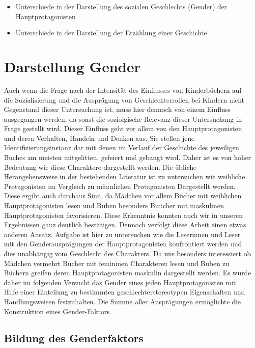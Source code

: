 \begin{itemize}
\item
  Unterschiede in der Darstellung des sozialen Geschlechts (Gender) der
  Hauptprotagonisten
\item
  Unterschiede in der Darstellung der Erzählung einer Geschichte
\end{itemize}

\section{Darstellung Gender}

Auch wenn die Frage nach der Intensität des Einflusses von Kinderbüchern
auf die Sozialisierung und die Ausprägung von Geschlechterrollen bei
Kindern nicht Gegenstand dieser Untersuchung ist, muss hier dennoch von
einem Einfluss ausgegangen werden, da sonst die soziolgische Relevanz
dieser Untersuchung in Frage gestellt wird. Dieser Einfluss geht vor
allem von den Hauptprotagonisten und deren Verhalten, Handeln und Denken
aus. Sie stellen jene Identifizierungsinstanz dar mit denen im Verlauf
der Geschichte des jeweiligen Buches am meisten mitgelitten, gefeiert
und gebangt wird. Daher ist es von hoher Bedeutung wie diese Charaktere
dargestellt werden. Die übliche Herangehensweise in der bestehenden
Literatur ist zu untersuchen wie weibliche Protagonisten im Vergleich zu
männlichen Protagonisten Dargestellt werden. Diese ergibt auch durchaus
Sinn, da Mädchen vor allem Bücher mit weiblichen Hauptprotagonisten
lesen und Buben besonders Buücher mit maskulinen Hauptprotagonisten
favorisieren. Diese Erkenntnis konnten auch wir in unseren Ergebnissen
ganz deutlich bestätigen. Dennoch verfolgt diese Arbeit einen etwas
anderen Ansatz. Aufgabe ist hier zu untersuchen wie die Leserinnen und
Leser mit den Genderausprägungen der Hauptprotagonisten konfrontiert
werden und dies unabhängig vom Geschlecht des Charakters. Da uns
besonders interessiert ob Mädchen vermehrt Bücher mit femininen
Charakteren lesen und Buben zu Büchern greifen deren Hauptprotagonisten
maskulin dargestellt werden. Es wurde daher im folgenden Versucht das
Gender eines jeden Hauptprotagonisten mit Hilfe einer Einteilung zu
bestimmten geschlechterstereotypen Eigenschaften und Handlungsweisen
festzuhalten. Die Summe aller Ausprägungen ermöglichte die Konstruktion
eines Gender-Faktors.

\subsection{Bildung des Genderfaktors}

